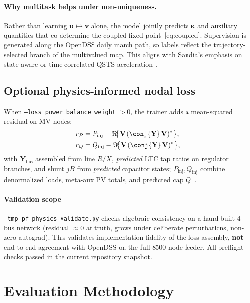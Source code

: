 \documentclass[11pt,a4paper]{article}
\begin{document}
\paragraph{Why multitask helps under non-uniqueness.}
Rather than learning $\mathbf{u}\mapsto\mathbf{v}$ alone, the model jointly
predicts $\boldsymbol{\kappa}$ and auxiliary quantities that co-determine the
coupled fixed point~\eqref{eq:coupled}.  Supervision is generated along the
OpenDSS daily march path, so labels reflect the trajectory-selected branch of the
multivalued map.  This aligns with Sandia's emphasis on state-aware or
time-correlated QSTS acceleration~\cite{deboever2017qsts,reno2017vq}.

\subsection{Optional physics-informed nodal loss}

When \texttt{--loss\_power\_balance\_weight} $> 0$, the trainer adds a mean-squared
residual on MV nodes:
\begin{align}
  r_P &= P_{\mathrm{inj}} - \Re\!\big\{ \mathbf{V}\,(\conj{\mathbf{Y}}\,\mathbf{V})^*\big\}, \\
  r_Q &= Q_{\mathrm{inj}} - \Im\!\big\{ \mathbf{V}\,(\conj{\mathbf{Y}}\,\mathbf{V})^*\big\},
\end{align}
with $\mathbf{Y}_{\mathrm{bus}}$ assembled from line $R/X$, \emph{predicted} LTC
tap ratios on regulator branches, and shunt $jB$ from \emph{predicted} capacitor
states; $P_{\mathrm{inj}},Q_{\mathrm{inj}}$ combine denormalized loads, meta-aux
PV totals, and predicted cap $Q$~\cite{gnn2_ieee8500_avc}.

\paragraph{Validation scope.}
\texttt{\_tmp\_pf\_physics\_validate.py} checks algebraic consistency on a
hand-built 4-bus network (residual $\approx 0$ at truth, grows under deliberate
perturbations, non-zero autograd).  This validates implementation fidelity of the
loss assembly, \textbf{not} end-to-end agreement with OpenDSS on the full 8500-node
feeder.  All preflight checks passed in the current repository snapshot.

\section{Evaluation Methodology}
\label{sec:eval}
\end{document}
